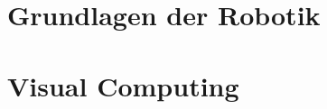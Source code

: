 \documentclass[english, notodo]{fdsummary}
\newcommand{\lstbasepath}{unset}
\begin{document}
	\cleardoublepage
	\part{Grundlagen der Robotik}
	\graphicspath{{./cs/elective/ce/gdr/}}
	\renewcommand{\lstbasepath}{./cs/elective/ce/gdr}
	

	\cleardoublepage
	\part{Visual Computing}
	\graphicspath{{./cs/mandatory/fs5/vc/}}
	\renewcommand{\lstbasepath}{./cs/mandatory/fs5/vc}
	
\end{document}
